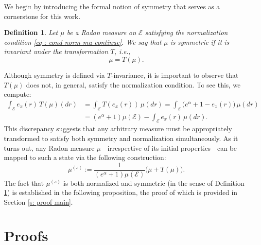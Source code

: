 \documentclass[10pt,a4paper]{amsart}
\newtheorem{df}{Definition}
\begin{document}
{We begin by introducing the formal notion of symmetry that serves as a cornerstone for this work.
\begin{df}\label{def: sym mu}
Let $\mu$ be a Radon measure on $\mathcal{E}$ satisfying the normalization condition \eqref{eq : cond norm mu continue}. We say that $\mu$ is symmetric if it is invariant under the transformation $T$, i.e.,
\[
\mu = T(\mu).
\]
\end{df}
Although symmetry is defined via $T$-invariance, it is important to observe that $T(\mu)$ does not, in general, satisfy the normalization condition. To see this, we compute:
\begin{align*}
\int_\mathcal{E} e_x(r)\, T(\mu)(dr) 
&= \int_\mathcal{E} T(e_x(r))\, \mu(dr) 
= \int_\mathcal{E} \big(e^\alpha + 1 - e_x(r)\big)\, \mu(dr) \\
&= (e^\alpha + 1)\mu(\mathcal{E}) - \int_\mathcal{E} e_x(r)\, \mu(dr) .
\end{align*}
This discrepancy suggests that any arbitrary measure must be appropriately transformed to satisfy both symmetry and normalization simultaneously. As it turns out, any Radon measure $\mu$—irrespective of its initial properties—can be mapped to such a state via the following construction:
\begin{equation}\label{eq: mu(s)}
\mu^{(s)} := \frac{1}{(e^\alpha + 1)\mu(\mathcal{E})} \big( \mu + T(\mu) \big).
\end{equation}
The fact that $\mu^{(s)}$ is both normalized and symmetric (in the sense of Definition \ref{def: sym mu}) is established in the following proposition, the proof of which is provided in Section \ref{s: proof main}.}

\section{Proofs}{\label{s: proof main}}
\end{document}
